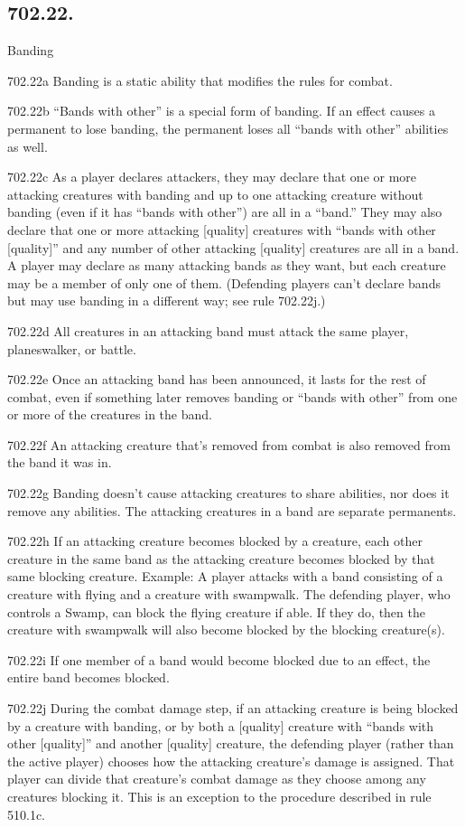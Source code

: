 \subsection*{702.22.}
Banding

702.22a Banding is a static ability that modifies the rules for combat.

702.22b “Bands with other” is a special form of banding. If an effect causes a permanent to lose banding, the permanent loses all “bands with other” abilities as well.

702.22c As a player declares attackers, they may declare that one or more attacking creatures with banding and up to one attacking creature without banding (even if it has “bands with other”) are all in a “band.” They may also declare that one or more attacking [quality] creatures with “bands with other [quality]” and any number of other attacking [quality] creatures are all in a band. A player may declare as many attacking bands as they want, but each creature may be a member of only one of them. (Defending players can’t declare bands but may use banding in a different way; see rule 702.22j.)

702.22d All creatures in an attacking band must attack the same player, planeswalker, or battle.

702.22e Once an attacking band has been announced, it lasts for the rest of combat, even if something later removes banding or “bands with other” from one or more of the creatures in the band.

702.22f An attacking creature that’s removed from combat is also removed from the band it was in.

702.22g Banding doesn’t cause attacking creatures to share abilities, nor does it remove any abilities. The attacking creatures in a band are separate permanents.

702.22h If an attacking creature becomes blocked by a creature, each other creature in the same band as the attacking creature becomes blocked by that same blocking creature.
Example: A player attacks with a band consisting of a creature with flying and a creature with swampwalk. The defending player, who controls a Swamp, can block the flying creature if able. If they do, then the creature with swampwalk will also become blocked by the blocking creature(s).

702.22i If one member of a band would become blocked due to an effect, the entire band becomes blocked.

702.22j During the combat damage step, if an attacking creature is being blocked by a creature with banding, or by both a [quality] creature with “bands with other [quality]” and another [quality] creature, the defending player (rather than the active player) chooses how the attacking creature’s damage is assigned. That player can divide that creature’s combat damage as they choose among any creatures blocking it. This is an exception to the procedure described in rule 510.1c.


